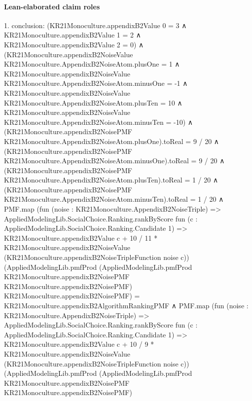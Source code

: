 \documentclass[10pt]{article}
\begin{document}
\paragraph{Lean-elaborated claim roles}\begin{ReviewVerbatim}
1. conclusion: (KR21Monoculture.appendixB2Value 0 = 3 ∧
    KR21Monoculture.appendixB2Value 1 = 2 ∧ KR21Monoculture.appendixB2Value 2 = 0) ∧
  (KR21Monoculture.appendixB2NoiseValue KR21Monoculture.AppendixB2NoiseAtom.plusOne = 1 ∧
      KR21Monoculture.appendixB2NoiseValue KR21Monoculture.AppendixB2NoiseAtom.minusOne = -1 ∧
        KR21Monoculture.appendixB2NoiseValue KR21Monoculture.AppendixB2NoiseAtom.plusTen = 10 ∧
          KR21Monoculture.appendixB2NoiseValue KR21Monoculture.AppendixB2NoiseAtom.minusTen = -10) ∧
    (KR21Monoculture.appendixB2NoisePMF KR21Monoculture.AppendixB2NoiseAtom.plusOne).toReal = 9 / 20 ∧
      (KR21Monoculture.appendixB2NoisePMF KR21Monoculture.AppendixB2NoiseAtom.minusOne).toReal = 9 / 20 ∧
        (KR21Monoculture.appendixB2NoisePMF KR21Monoculture.AppendixB2NoiseAtom.plusTen).toReal = 1 / 20 ∧
          (KR21Monoculture.appendixB2NoisePMF KR21Monoculture.AppendixB2NoiseAtom.minusTen).toReal = 1 / 20 ∧
            PMF.map
                  (fun (noise : KR21Monoculture.AppendixB2NoiseTriple) =>
                    AppliedModelingLib.SocialChoice.Ranking.rankByScore
                      fun (c : AppliedModelingLib.SocialChoice.Ranking.Candidate 1) =>
                      KR21Monoculture.appendixB2Value c +
                        10 / 11 *
                          KR21Monoculture.appendixB2NoiseValue (KR21Monoculture.appendixB2NoiseTripleFunction noise c))
                  (AppliedModelingLib.pmfProd
                    (AppliedModelingLib.pmfProd KR21Monoculture.appendixB2NoisePMF KR21Monoculture.appendixB2NoisePMF)
                    KR21Monoculture.appendixB2NoisePMF) =
                KR21Monoculture.appendixB2AlgorithmRankingPMF ∧
              PMF.map
                    (fun (noise : KR21Monoculture.AppendixB2NoiseTriple) =>
                      AppliedModelingLib.SocialChoice.Ranking.rankByScore
                        fun (c : AppliedModelingLib.SocialChoice.Ranking.Candidate 1) =>
                        KR21Monoculture.appendixB2Value c +
                          10 / 9 *
                            KR21Monoculture.appendixB2NoiseValue
                              (KR21Monoculture.appendixB2NoiseTripleFunction noise c))
                    (AppliedModelingLib.pmfProd
                      (AppliedModelingLib.pmfProd KR21Monoculture.appendixB2NoisePMF KR21Monoculture.appendixB2NoisePMF)

\end{ReviewVerbatim}
\end{document}
